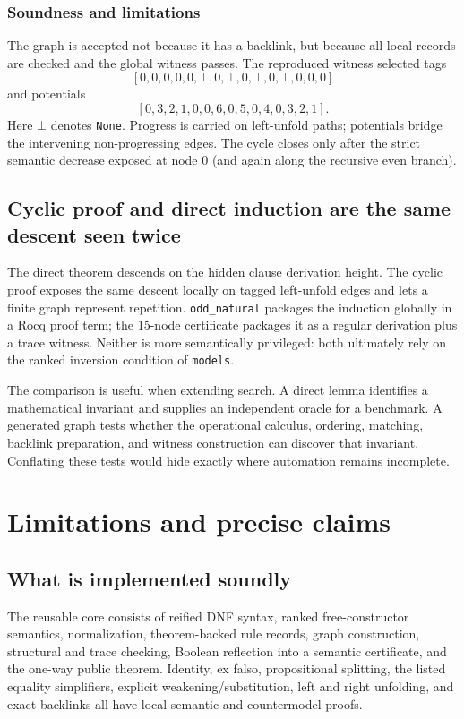 \documentclass[11pt,oneside]{book}
\DeclareRobustCommand{\code}[1]{\nolinkurl{#1}}
\newcommand{\soundlim}{\subsection*{Soundness and limitations}}
\begin{document}
\soundlim

The graph is accepted not because it has a backlink, but because all local
records are checked and the global witness passes.  The reproduced witness
selected tags
\[
 [0,0,0,0,0,\bot,0,\bot,0,\bot,0,\bot,0,0,0]
\]
and potentials
\[
 [0,3,2,1,0,0,6,0,5,0,4,0,3,2,1].
\]
Here \(\bot\) denotes \code{None}.  Progress is carried on left-unfold paths;
potentials bridge the intervening non-progressing edges.  The cycle closes
only after the strict semantic decrease exposed at node 0 (and again along the
recursive even branch).

\section{Cyclic proof and direct induction are the same descent seen twice}

The direct theorem descends on the hidden clause derivation height.  The cyclic
proof exposes the same descent locally on tagged left-unfold edges and lets a
finite graph represent repetition.  \code{odd_natural} packages the induction
globally in a Rocq proof term; the 15-node certificate packages it as a regular
derivation plus a trace witness.  Neither is more semantically privileged:
both ultimately rely on the ranked inversion condition of \code{models}.

The comparison is useful when extending search.  A direct lemma identifies a
mathematical invariant and supplies an independent oracle for a benchmark.
A generated graph tests whether the operational calculus, ordering, matching,
backlink preparation, and witness construction can discover that invariant.
Conflating these tests would hide exactly where automation remains incomplete.

\chapter{Limitations and precise claims}
\label{ch:limits}

\section{What is implemented soundly}

The reusable core consists of reified DNF syntax, ranked free-constructor
semantics, normalization, theorem-backed rule records, graph construction,
structural and trace checking, Boolean reflection into a semantic certificate,
and the one-way public theorem.  Identity, ex falso, propositional splitting,
the listed equality simplifiers, explicit weakening/substitution, left and
right unfolding, and exact backlinks all have local semantic and countermodel
proofs.
\end{document}
